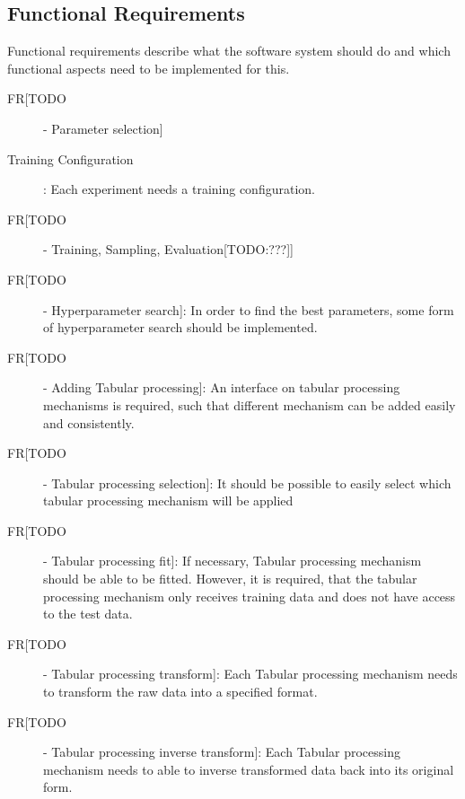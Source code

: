 \subsection*{Functional Requirements}
\label{sec:func_requirements}
Functional requirements describe what the software system should do and which functional aspects need to be implemented for this.

\begin{description}
    \item[FR[TODO] - Parameter selection] 
    \item[Training Configuration]: %
    Each experiment needs a training configuration.

    \item[FR[TODO] - Training, Sampling, Evaluation[TODO:???]]  
    

    \item[FR[TODO] - Hyperparameter search]:
    In order to find the best parameters, some form of hyperparameter search should be implemented.

    \item[FR[TODO] - Adding Tabular processing]:
    An interface on tabular processing mechanisms is required, such that different mechanism can be added easily and consistently.
    
    \item[FR[TODO] - Tabular processing selection]:
    It should be possible to easily select which tabular processing mechanism will be applied

    \item[FR[TODO] - Tabular processing fit]:
    If necessary, Tabular processing mechanism should be able to be fitted.
    However, it is required, that the tabular processing mechanism only receives training data and does not have access to the test data.

    \item[FR[TODO] - Tabular processing transform]:
    Each Tabular processing mechanism needs to transform the raw data into a specified format.

    \item[FR[TODO] - Tabular processing inverse transform]:
    Each Tabular processing mechanism needs to able to inverse transformed data back into its original form.

\end{description}





